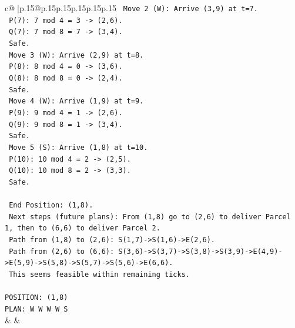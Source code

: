 \documentclass{article}
\begin{document}
{\begin{supertabular}{c@{$\;$}|p{.15\linewidth}@{}p{.15\linewidth}p{.15\linewidth}p{.15\linewidth}p{.15\linewidth}p{.15\linewidth}}
{{{\texttt{  Move 2 (W): Arrive (3,9) at t=7.} \\
\texttt{    P(7): 7 mod 4 = 3 {-}> (2,6).} \\
\texttt{    Q(7): 7 mod 8 = 7 {-}> (3,4).} \\
\texttt{    Safe.} \\
\texttt{  Move 3 (W): Arrive (2,9) at t=8.} \\
\texttt{    P(8): 8 mod 4 = 0 {-}> (3,6).} \\
\texttt{    Q(8): 8 mod 8 = 0 {-}> (2,4).} \\
\texttt{    Safe.} \\
\texttt{  Move 4 (W): Arrive (1,9) at t=9.} \\
\texttt{    P(9): 9 mod 4 = 1 {-}> (2,6).} \\
\texttt{    Q(9): 9 mod 8 = 1 {-}> (3,4).} \\
\texttt{    Safe.} \\
\texttt{  Move 5 (S): Arrive (1,8) at t=10.} \\
\texttt{    P(10): 10 mod 4 = 2 {-}> (2,5).} \\
\texttt{    Q(10): 10 mod 8 = 2 {-}> (3,3).} \\
\texttt{    Safe.} \\
\\ 
\texttt{  End Position: (1,8).} \\
\texttt{  Next steps (future plans): From (1,8) go to (2,6) to deliver Parcel 1, then to (6,6) to deliver Parcel 2.} \\
\texttt{  Path from (1,8) to (2,6): S(1,7){-}>S(1,6){-}>E(2,6).} \\
\texttt{  Path from (2,6) to (6,6): S(3,6){-}>S(3,7){-}>S(3,8){-}>S(3,9){-}>E(4,9){-}>E(5,9){-}>S(5,8){-}>S(5,7){-}>S(5,6){-}>E(6,6).} \\
\texttt{  This seems feasible within remaining ticks.} \\
\\ 
\texttt{POSITION: (1,8)} \\
\texttt{PLAN: W W W W S} \\
            }
        }
    }
    & & \\ \\


\end{supertabular}}
\end{document}
